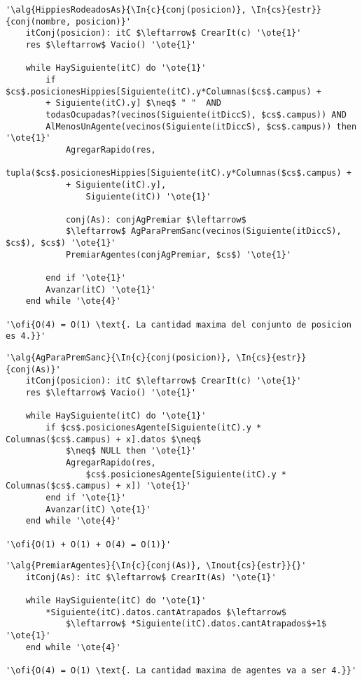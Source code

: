 \begin{lstlisting}[mathescape]
'\alg{HippiesRodeadosAs}{\In{c}{conj(posicion)}, \In{cs}{estr}}{conj(nombre, posicion)}'
	itConj(posicion): itC $\leftarrow$ CrearIt(c) '\ote{1}'
	res $\leftarrow$ Vacio() '\ote{1}'

	while HaySiguiente(itC) do '\ote{1}'
		if $cs$.posicionesHippies[Siguiente(itC).y*Columnas($cs$.campus) +
		+ Siguiente(itC).y] $\neq$ " "  AND
		todasOcupadas?(vecinos(Siguiente(itDiccS), $cs$.campus)) AND
		AlMenosUnAgente(vecinos(Siguiente(itDiccS), $cs$.campus)) then '\ote{1}'
			AgregarRapido(res,
			tupla($cs$.posicionesHippies[Siguiente(itC).y*Columnas($cs$.campus) +
			+ Siguiente(itC).y],
				Siguiente(itC)) '\ote{1}'

			conj(As): conjAgPremiar $\leftarrow$
			$\leftarrow$ AgParaPremSanc(vecinos(Siguiente(itDiccS), $cs$), $cs$) '\ote{1}'
			PremiarAgentes(conjAgPremiar, $cs$) '\ote{1}'

		end if '\ote{1}'
		Avanzar(itC) '\ote{1}'
	end while '\ote{4}'

'\ofi{O(4) = O(1) \text{. La cantidad maxima del conjunto de posicion es 4.}}'
\end{lstlisting}

\begin{lstlisting}[mathescape]
'\alg{AgParaPremSanc}{\In{c}{conj(posicion)}, \In{cs}{estr}}{conj(As)}'
	itConj(posicion): itC $\leftarrow$ CrearIt(c) '\ote{1}'
	res $\leftarrow$ Vacio() '\ote{1}'

	while HaySiguiente(itC) do '\ote{1}'
		if $cs$.posicionesAgente[Siguiente(itC).y * Columnas($cs$.campus) + x].datos $\neq$
			$\neq$ NULL then '\ote{1}'
			AgregarRapido(res,
				$cs$.posicionesAgente[Siguiente(itC).y * Columnas($cs$.campus) + x]) '\ote{1}'
		end if '\ote{1}'
		Avanzar(itC) \ote{1}'
	end while '\ote{4}'

'\ofi{O(1) + O(1) + O(4) = O(1)}'
\end{lstlisting}

\begin{lstlisting}[mathescape]
'\alg{PremiarAgentes}{\In{c}{conj(As)}, \Inout{cs}{estr}}{}'
	itConj(As): itC $\leftarrow$ CrearIt(As) '\ote{1}'

	while HaySiguiente(itC) do '\ote{1}'
		*Siguiente(itC).datos.cantAtrapados $\leftarrow$
			$\leftarrow$ *Siguiente(itC).datos.cantAtrapados$+1$ '\ote{1}'
	end while '\ote{4}'

'\ofi{O(4) = O(1) \text{. La cantidad maxima de agentes va a ser 4.}}'
\end{lstlisting}

